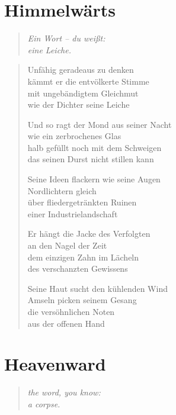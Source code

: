 
\cleartoverso

\section{Himmelwärts}

\begin{quote}
\itshape\smaller
Ein Wort -- du weißt:\\
eine Leiche.

\end{quote}

\begin{verse}

Unfähig geradeaus zu denken\\
kämmt er die entvölkerte Stimme\\
mit ungebändigtem Gleichmut\\
wie der Dichter seine Leiche

Und so ragt der Mond aus seiner Nacht\\
wie ein zerbrochenes Glas\\
halb gefüllt noch mit dem Schweigen\\
das seinen Durst nicht stillen kann

Seine Ideen flackern wie seine Augen\\
Nordlichtern gleich\\
über fliedergetränkten Ruinen\\
einer Industrielandschaft

Er hängt die Jacke des Verfolgten\\
an den Nagel der Zeit\\
dem einzigen Zahn im Lächeln\\
des verschanzten Gewissens

\clearpage

Seine Haut sucht den kühlenden Wind\\
Amseln picken seinem Gesang\\
die versöhnlichen Noten\\
aus der offenen Hand

\end{verse}

\clearpage

\section{Heavenward}

\begin{quote}
\itshape\smaller
the word, you know:\\
a corpse.

\end{quote}

